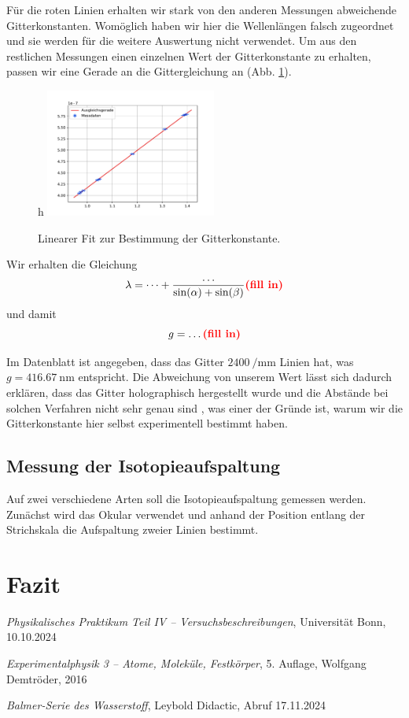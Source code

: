 \documentclass{article}
\newcommand{\defc}{black}
\newcommand{\colorT}[2][blue]{\color{#1}{#2}\color{\defc}}
\newcommand{\todo}[1]{\colorT[red]{\textbf{(#1)}}}
\begin{document}
Für die roten Linien erhalten wir stark von den anderen Messungen abweichende Gitterkonstanten.
Womöglich haben wir hier die Wellenlängen falsch zugeordnet und sie werden für die weitere Auswertung nicht verwendet.
Um aus den restlichen Messungen einen einzelnen Wert der Gitterkonstante zu erhalten, passen wir eine Gerade
an die Gittergleichung an (Abb. \ref{fig:fit-gitterkonstante}).
\begin{figure}{h}
  \centering
  \includegraphics[width=0.5\textwidth]{fit-gitterkonstante}
  \caption{Linearer Fit zur Bestimmung der Gitterkonstante.}
  \label{fig:fit-gitterkonstante}
\end{figure}
Wir erhalten die Gleichung
\[
  \lambda = \dots + \frac{\dots}{\sin(\alpha)+\sin(\beta)} \todo{fill in}
\]
und damit
\[
  g = \dots \todo{fill in}
\]

Im Datenblatt \cite{leybold-balmer} ist angegeben,
dass das Gitter $\SI{2400}{\per\mm}$ Linien hat, was $g = \SI{416.67}{\nm}$ entspricht.
Die Abweichung von unserem Wert lässt sich dadurch erklären, dass das Gitter holographisch hergestellt wurde und
die Abstände bei solchen Verfahren nicht sehr genau sind \cite{Anleitung} \todo{stimmt das?}, was einer der Gründe ist,
warum wir die Gitterkonstante hier selbst experimentell bestimmt haben.


\subsection{Messung der Isotopieaufspaltung}
Auf zwei verschiedene Arten soll die Isotopieaufspaltung gemessen werden. Zunächst wird das Okular verwendet und anhand
der Position entlang der Strichskala die Aufspaltung zweier Linien bestimmt.

\clearpage
\section{Fazit}


\clearpage
\begin{thebibliography}{9}

\textit{Physikalisches Praktikum Teil IV -- Versuchsbeschreibungen}, Universität Bonn, 10.10.2024

\textit{Experimentalphysik 3 -- Atome, Moleküle, Festkörper}, 5. Auflage, Wolfgang Demtröder, 2016

\textit{Balmer-Serie des Wasserstoff}, Leybold Didactic, Abruf 17.11.2024

\end{thebibliography}
\end{document}
